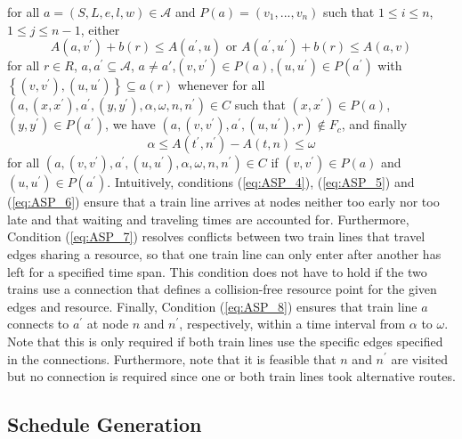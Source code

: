\documentclass{article}
\begin{document}
for all $a= (S, L, e, l, w)\in\mathcal{A}$ and $P(a) = (v_1, . . . , v_n)$ such that $1\leq i\leq n$,$1\leq j\leq n-1$,
either
\begin{equation}
A(a, v^\prime) +b(r) \leq A(a^\prime, u) \textrm{ or }A(a^\prime, u^\prime) +b(r)\leq A(a, v) \label{eq:ASP_7}
\end{equation}
for all $r\in R$, ${a, a^\prime} \subseteq \mathcal{A}$, $a\not=a'$,$(v, v^\prime)\in P(a)$,$(u, u^\prime)\in P(a^\prime)$ with $\left\{(v, v^\prime),(u, u^\prime)\right\} \subseteq a(r)$ whenever for all $(a,(x, x^\prime), a^\prime,(y, y^\prime), \alpha, \omega, n, n^\prime)\in C$ such that $(x, x^\prime)\in P(a)$,$(y, y^\prime)\in P(a^\prime)$, we have $(a,(v, v^\prime), a^\prime,(u, u^\prime), r)\not\in F_c$, and finally
\begin{equation}
\alpha\leq A(t^\prime, n^\prime)-A(t, n)\leq \omega\label{eq:ASP_8}
\end{equation}
for all $(a,(v, v^\prime), a^\prime,(u, u^\prime), \alpha, \omega, n, n^\prime)\in C$ if $(v, v^\prime)\in P(a)$ and $(u, u^\prime)\in P(a^\prime)$.
%
Intuitively, conditions (\ref{eq:ASP_4}), (\ref{eq:ASP_5}) and (\ref{eq:ASP_6}) ensure that a train line arrives at nodes neither too early nor too late and that waiting and traveling times are accounted for. Furthermore, Condition (\ref{eq:ASP_7}) resolves conflicts between two train lines that travel edges sharing a resource, so that one train line can only enter after another has left for a specified time span. This condition does not have to hold if the two trains use a connection that defines a collision-free resource point for the given edges and resource. Finally, Condition (\ref{eq:ASP_8}) ensures that train line $a$ connects to $a^\prime$ at node $n$ and $n^\prime$, respectively, within a time interval from $\alpha$ to $\omega$. Note that this is only required if both train lines use the specific edges specified in the connections. Furthermore, note that it is feasible that $n$ and $n^\prime$ are visited but no connection is required since one or both train lines took alternative routes.





\subsection{Schedule Generation}\label{subsubsec:schedulegeneration}
\end{document}
